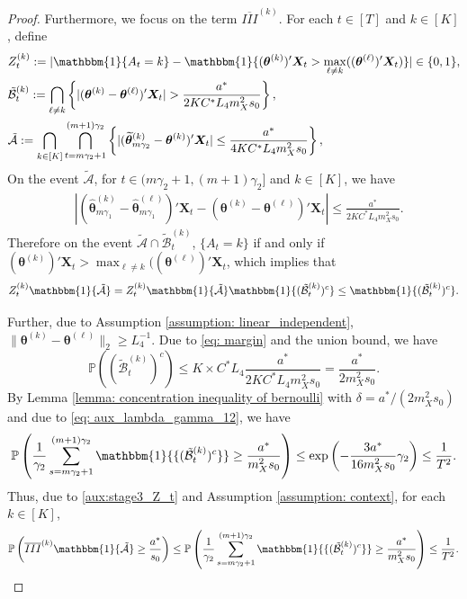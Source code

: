\documentclass[10pt,a4paper]{amsart}
\newcommand{\Pro}{\mathbb{P}}
\newcommand{\bX}{\boldsymbol{X}}
\newcommand{\btheta}{\boldsymbol{\theta}}
\newcommand{\cA}{\mathcal{A}}
\newcommand{\hbtheta}{\widehat{\boldsymbol{\theta}}}
\newcommand{\idf}{\mathbbm{1}}
\newcommand{\tbtheta}{\widetilde{\boldsymbol{\theta}}}
\begin{document}
\begin{proof}
Furthermore, we focus on the term $\overline{III}^{(k)}$. For each $t \in [T]$ and  $k\in[K]$, define
\begin{align*}
    &Z_t^{(k)}:=|\idf\{A_t=k\}-\idf\{(\btheta^{(k)})'\bX_t>\max_{\ell \neq k}((\btheta^{(\ell)})'\bX_t)\}|\in \{0,1\},\\
     & \tilde{\mathcal{B}}_t^{(k)} := \bigcap_{\ell \neq k}\left\{|(\btheta^{(k)}-\btheta^{(\ell)})'\bX_t| > \frac{a^*}{ 2KC^*L_4 m_X^2 s_0}\right\},\\
&     \tilde{\mathcal{A}} := \bigcap_{k\in [K]} \bigcap_{t = m\gamma_2 + 1}^{(m+1)\gamma_2}\left\{|(\tbtheta_{m\gamma_2}^{(k)}-\btheta^{(k)})'\bX_t| \le \frac{a^*}{ 4KC^*L_4 m_X^2 s_0}\right\},
\end{align*}
On the event $\tilde{\mathcal{A}}$, for $t \in (m\gamma_2+1,(m+1)\gamma_2]$ and $k \in [K]$, we have 
\begin{align*}
&|(\hbtheta_{m\gamma_1}^{(k)}-\hbtheta_{m\gamma_1}^{(\ell)})'\bX_t-(\btheta^{(k)}-\btheta^{(\ell)})'\bX_t|
 \le  \frac{a^*}{ 2KC^*L_4 m_X^2 s_0}.
\end{align*}
Therefore on the event $\tilde{\mathcal{A}}\cap \tilde{\mathcal{B}}_t^{(k)}$, $\{A_t = k\}$ if and only if
$(\btheta^{(k)})'\bX_t>\max_{\ell \neq k}((\btheta^{(\ell)})'\bX_t$, which implies that
\begin{equation}\label{aux:stage3_Z_t}
    Z_t^{(k)} \idf\{\tilde{\cA}\} = Z_t^{(k)} \idf\{\tilde{\cA}\} \idf\{(\tilde{\mathcal{B}}_t^{(k)})^c\} \leq \idf\{(\tilde{\mathcal{B}}_t^{(k)})^c\}.
\end{equation}
 

Further, due to Assumption \ref{assumption: linear_independent}, $\|\btheta^{(k)}-\btheta^{(\ell)}\|_2 \geq L_4^{-1}$. 
Due to \eqref{eq: margin} and the union bound, we have
\begin{equation*}  
\Pro((\tilde{\mathcal{B}}_t^{(k)})^c)\le K \times C^* L_4  \frac{a^*}{ 2KC^*L_4 m_X^2 s_0} = \frac{a^*}{2m_X^2 s_0}.
 \end{equation*}
 By Lemma \ref{lemma: concentration inequality of bernoulli} with $\delta = a^*/(2m_X^2s_0)$ and due to \eqref{eq: aux_lambda_gamma_12}, we have
\begin{equation*}
\Pro\left( \frac{1}{\gamma_2}\sum_{s=m \gamma_2+1}^{(m+1)\gamma_2} \idf{\{(\tilde{\mathcal{B}}_t^{(k)})^c\}}\ge \frac{a^*}{m_X^2 s_0}   \right)\leq \exp\left(- \frac{3a^*}{16m_X^2s_0} \gamma_2\right) \leq \frac{1}{T^2}.
\end{equation*}
Thus, due to \eqref{aux:stage3_Z_t} and Assumption \ref{assumption: context}, for each $k \in [K]$,
\begin{equation}\label{aux:stage3_III}
    \Pro\left( \overline{III}^{(k)} \idf\{\tilde{\cA}\} \ge \frac{a^*}{ s_0} \right) \leq \Pro\left( \frac{1}{\gamma_2}\sum_{s=m \gamma_2+1}^{(m+1)\gamma_2} \idf{\{(\tilde{\mathcal{B}}_t^{(k)})^c\}}\ge \frac{a^*}{m_X^2 s_0}   \right)\leq   \frac{1}{T^2}. 
\end{equation}
 



\end{proof}
\end{document}
